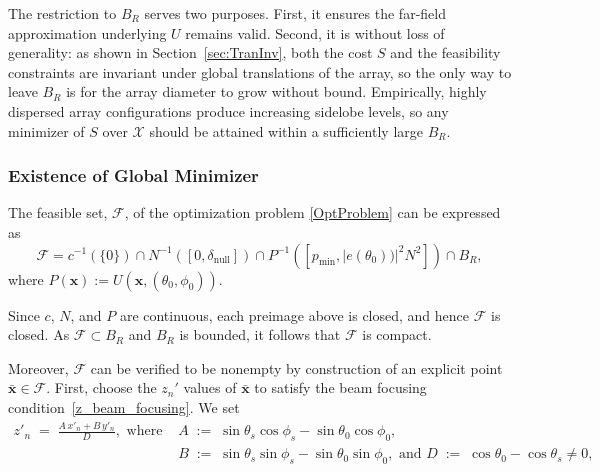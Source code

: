 \documentclass[11pt,letterpaper]{article}
\theoremstyle{definition}
\theoremstyle{plain}
\begin{document}
The restriction to $B_R$ serves two purposes. First, it ensures the far-field approximation
underlying $U$ remains valid. Second, it is without loss of generality: as shown in
Section~\ref{sec:TranInv}, both the cost $S$ and the feasibility constraints are invariant under
global translations of the array, so the only way to leave $B_R$ is for the array diameter to grow
without bound. Empirically, highly dispersed array configurations produce increasing sidelobe levels,
so any minimizer of $S$ over $\mathcal{X}$ should be attained within a sufficiently large $B_R$.

\subsubsection{Existence of Global Minimizer}
\label{ExistenceofGlobalMinimizer}

The feasible set, $\mathcal{F}$, of the optimization problem \eqref{OptProblem} can be expressed as 
\begin{equation}
\mathcal{F} = c^{-1}(\{0\}) \cap N^{-1}([0, \delta_{\text{null}}]) \cap P^{-1}([p_{\mathrm{min}}, |e(\theta_0))|^2 N^2]) \cap B_R,
\end{equation}
where $P(\mathbf{x}) := U(\mathbf{x}, (\theta_0, \phi_0))$.

\medskip 

Since $c$, $N$, and $P$ are continuous, each preimage above is closed, and hence $\mathcal{F}$ is closed. As $\mathcal{F} \subset B_R$ and $B_R$ is bounded, it follows that $\mathcal{F}$ is compact.

\medskip

 
Moreover, $\mathcal{F}$ can be verified to be nonempty by construction of an explicit point $\mathbf{\bar{x}}\in\mathcal{F}$. First, choose the $z_n'$ values of $\mathbf{\bar{x}}$ to satisfy the beam focusing condition~\eqref{z_beam_focusing}. We set
\begin{align*}
    z'_n \;=\; \frac{A\,x'_n + B\,y'_n}{D},
    \text{ where }
    &A \;:=\; \sin\theta_s\cos\phi_s - \sin\theta_0\cos\phi_0, \\
    &B \;:=\; \sin\theta_s\sin\phi_s - \sin\theta_0\sin\phi_0, \text{ and } D \;:=\; \cos\theta_0 - \cos\theta_s \neq 0,
\end{align*}
\end{document}
